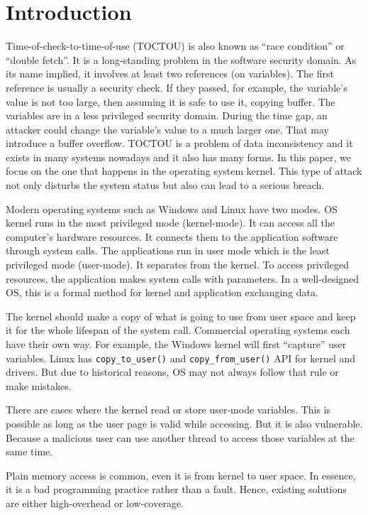 
\section{Introduction}
\label{sec:introduction}

Time-of-check-to-time-of-use (TOCTOU) is also known as ``race condition'' or ``double fetch''. It is a long-standing problem in the software security domain. As its name implied, it involves at least two references (on variables). The first reference is usually a security check.  If they passed, for example, the variable's value is not too large,  then assuming it is safe to use it, copying buffer. The variables are in a less privileged security domain. During the time gap,  an attacker could change the variable's value to a much larger one. That may introduce a buffer overflow. TOCTOU is a problem of data inconsistency and it exists in many systems nowadays and it also has many forms. In this paper, we focus on the one that happens in the operating system kernel. This type of attack not only disturbs the system status but also can lead to a serious breach.

Modern operating systems such as Windows and Linux have two modes. OS kernel runs in the most privileged mode (kernel-mode). It can access all the computer's hardware resources. It connects them to the application software through system calls. The applications run in user mode which is the least privileged mode (user-mode). It separates from the kernel. To access privileged resources, the application makes system calls with parameters. In a well-designed OS, this is a formal method for kernel and application exchanging data.


The kernel should make a copy of what is going to use from user space and keep it for the whole lifespan of the system call.  Commercial operating systems each have their own way. For example, the Windows kernel will first ``capture'' user variables. Linux has \texttt{copy\_to\_user()} and \texttt{copy\_from\_user()} API for kernel and drivers. But due to historical reasons, OS may not always follow that rule or make mistakes.

There are cases where the kernel read or store user-mode variables. This is possible as long as the user page is valid while accessing. But it is also vulnerable. Because a malicious user can use another thread to access those variables at the same time. 

Plain memory access is common, even it is from kernel to user space. In essence, it is a bad programming practice rather than a fault. Hence, existing solutions are either high-overhead or low-coverage.


